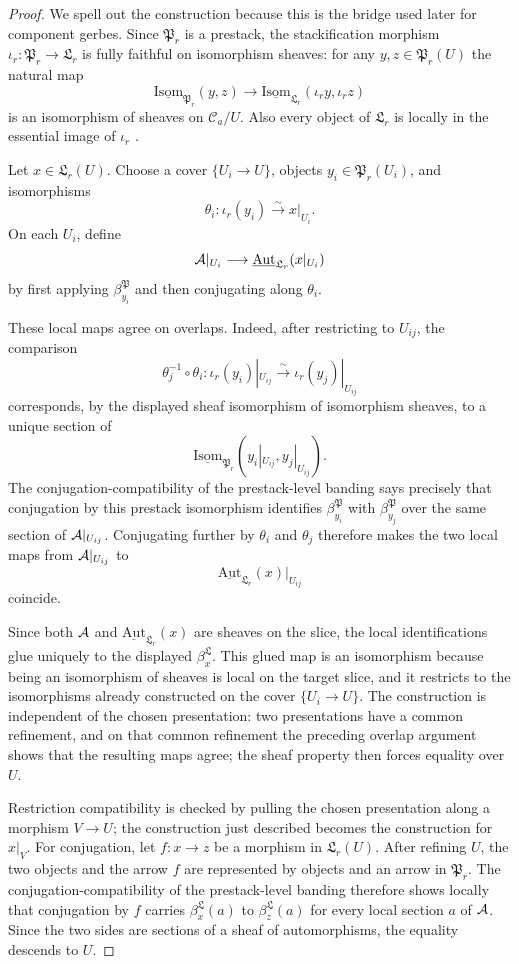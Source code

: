 \begin{proof}
We spell out the construction because this is the bridge used later for
component gerbes. Since $\mathfrak P_r$ is a prestack, the stackification
morphism $\iota_r:\mathfrak P_r\to\mathfrak L_r$ is fully faithful on
isomorphism sheaves: for any $y,z\in\mathfrak P_r(U)$ the natural map
\[
\underline{\mathrm{Isom}}_{\mathfrak P_r}(y,z)
\longrightarrow
\underline{\mathrm{Isom}}_{\mathfrak L_r}(\iota_r y,\iota_r z)
\]
is an isomorphism of sheaves on $\mathcal C_a/U$. Also every object of
$\mathfrak L_r$ is locally in the essential image of $\iota_r$
\cite[Tag 02ZP]{StacksProject}.

Let $x\in\mathfrak L_r(U)$. Choose a cover $\{U_i\to U\}$, objects
$y_i\in\mathfrak P_r(U_i)$, and isomorphisms
\[
\theta_i:\iota_r(y_i)\xrightarrow{\sim} x|_{U_i}.
\]
On each $U_i$, define
\[
\mathcal{A}|_{U_i}\longrightarrow
\underline{\mathrm{Aut}}_{\mathfrak L_r}(x|_{U_i})
\]
by first applying $\beta^{\mathfrak P}_{y_i}$ and then conjugating along
$\theta_i$.

These local maps agree on overlaps. Indeed, after restricting to
$U_{ij}$, the comparison
\[
\theta_j^{-1}\circ\theta_i:\iota_r(y_i)|_{U_{ij}}
\xrightarrow{\sim}
\iota_r(y_j)|_{U_{ij}}
\]
corresponds, by the displayed sheaf isomorphism of isomorphism sheaves, to a
unique section of
\[
\underline{\mathrm{Isom}}_{\mathfrak P_r}(y_i|_{U_{ij}},y_j|_{U_{ij}}).
\]
The conjugation-compatibility of the prestack-level banding says precisely that conjugation by
this prestack isomorphism identifies
$\beta^{\mathfrak P}_{y_i}$ with $\beta^{\mathfrak P}_{y_j}$ over the same
section of $\mathcal{A}|_{U_{ij}}$. Conjugating further by $\theta_i$ and $\theta_j$
therefore makes the two local maps from $\mathcal{A}|_{U_{ij}}$ to
\[
\underline{\mathrm{Aut}}_{\mathfrak L_r}(x)|_{U_{ij}}
\]
coincide.

Since both $\mathcal{A}$ and
$\underline{\mathrm{Aut}}_{\mathfrak L_r}(x)$ are sheaves on the slice, the
local identifications glue uniquely to the displayed
$\beta^{\mathfrak L}_x$. This glued map is an isomorphism because being an
isomorphism of sheaves is local on the target slice, and it restricts to the
isomorphisms already constructed on the cover $\{U_i\to U\}$. The construction
is independent of the chosen presentation: two presentations have a common
refinement, and on that common refinement the preceding overlap argument shows
that the resulting maps agree; the sheaf property then forces equality over
$U$.

Restriction compatibility is checked by pulling the chosen presentation along a
morphism $V\to U$; the construction just described becomes the construction for
$x|_V$. For conjugation, let $f:x\to z$ be a morphism in
$\mathfrak L_r(U)$. After refining $U$, the two objects and the arrow $f$ are
represented by objects and an arrow in $\mathfrak P_r$. The
conjugation-compatibility of the prestack-level banding therefore shows locally
that conjugation by $f$ carries $\beta^{\mathfrak L}_x(a)$ to
$\beta^{\mathfrak L}_z(a)$ for every local section $a$ of $\mathcal{A}$. Since the two
sides are sections of a sheaf of automorphisms, the equality descends to $U$.


\end{proof}
